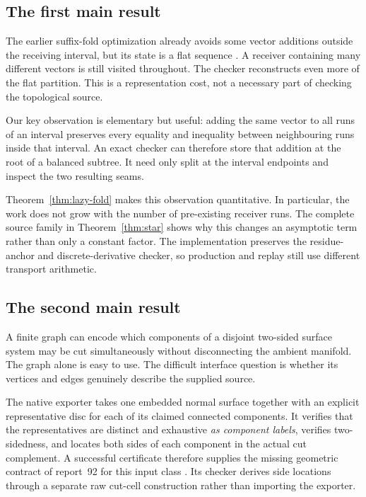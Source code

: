 \subsection{The first main result}

The earlier suffix-fold optimization already avoids some vector additions
outside the receiving interval, but its state is a flat sequence
\cite{suffix}. A receiver containing many different vectors is still
visited throughout. The checker reconstructs even more of the flat
partition. This is a representation cost, not a necessary part of checking
the topological source.

Our key observation is elementary but useful: adding the same vector to all
runs of an interval preserves every equality and inequality between
neighbouring runs inside that interval. An exact checker can therefore
store that addition at the root of a balanced subtree. It need only split
at the interval endpoints and inspect the two resulting seams.

Theorem~\ref{thm:lazy-fold} makes this observation quantitative. In
particular, the work does not grow with the number of pre-existing receiver
runs. The complete source family in Theorem~\ref{thm:star} shows why this
changes an asymptotic term rather than only a constant factor. The
implementation preserves the residue-anchor and discrete-derivative
checker, so production and replay still use different transport arithmetic.

\subsection{The second main result}

A finite graph can encode which components of a disjoint two-sided surface
system may be cut simultaneously without disconnecting the ambient manifold.
The graph alone is easy to use. The difficult interface question is whether
its vertices and edges genuinely describe the supplied source.

The native exporter takes one embedded normal surface together with an
explicit representative disc for each of its claimed connected components.
It verifies that the representatives are distinct and exhaustive
\emph{as component labels}, verifies two-sidedness, and locates both sides
of each component in the actual cut complement. A successful certificate
therefore supplies the missing geometric contract of report~92 for this
input class \cite{persistence}. Its checker derives side locations through
a separate raw cut-cell construction rather than importing the exporter.

